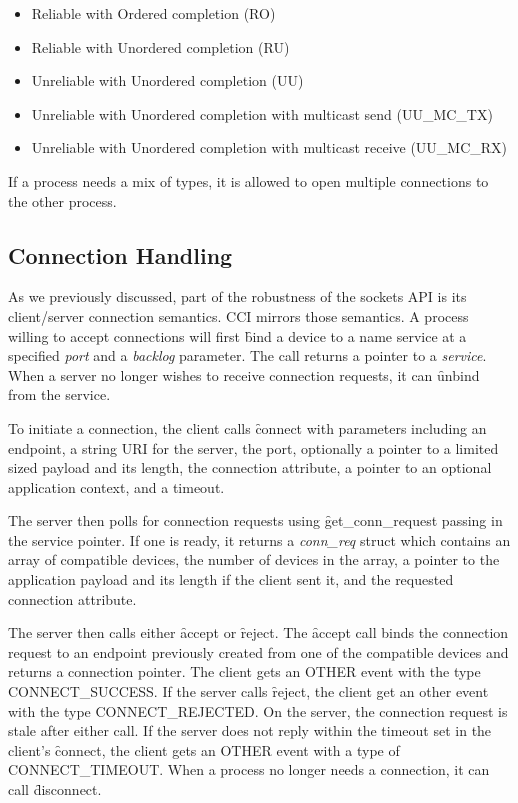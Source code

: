 \documentclass[conference]{IEEEtran}
\begin{document}
\begin{itemize}
\item Reliable with Ordered completion (RO)
\item Reliable with Unordered completion (RU)
\item Unreliable with Unordered completion (UU)
\item Unreliable with Unordered completion with multicast send (UU\_MC\_TX)
\item Unreliable with Unordered completion with multicast receive (UU\_MC\_RX)
\end{itemize}

If a process needs a mix of types, it is allowed to open multiple connections to the other
process.

\subsection{Connection Handling}
As we previously discussed, part of the robustness of the sockets API is its client/server
connection semantics. CCI mirrors those semantics. A process willing to accept connections
will first \f{bind} a device to a name service at a specified \emph{port} and a
\emph{backlog} parameter. The call returns a pointer to a \emph{service}. When a server no
longer wishes to receive connection requests, it can \f{unbind} from the service.

To initiate a connection, the client calls \f{connect} with parameters including an
endpoint, a string URI for the server, the port, optionally a pointer to a limited sized
payload and its length, the connection attribute, a pointer to an optional application
context, and a timeout.

The server then polls for connection requests using \f{get\_conn\_request} passing in the
service pointer. If one is ready, it returns a \emph{conn\_req} struct which contains an
array of compatible devices, the number of devices in the array, a pointer to the
application payload and its length if the client sent it, and the requested connection
attribute.

The server then calls either \f{accept} or \f{reject}. The \f{accept} call binds the
connection request to an endpoint previously created from one of the compatible devices
and returns a connection pointer. The client gets an OTHER event with the type
CONNECT\_SUCCESS. If the server calls \f{reject}, the client get an other event with the
type CONNECT\_REJECTED.  On the server, the connection request is stale after either call.
If the server does not reply within the timeout set in the client's \f{connect}, the
client gets an OTHER event with a type of CONNECT\_TIMEOUT. When a process no longer needs
a connection, it can call \f{disconnect}.
\end{document}
